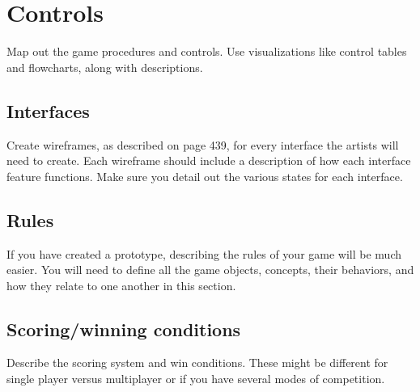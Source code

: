 \section{Controls} %
Map out the game procedures and controls. Use visualizations like control tables
and flowcharts, along with descriptions.

\subsection{Interfaces} %
Create wireframes, as described on page 439, for every interface the artists
will need to create. Each wireframe should include a description of how each
interface feature functions. Make sure you detail out the various states for
each interface.

\subsection{Rules} %
If you have created a prototype, describing the rules of your game will be much
easier. You will need to define all the game objects, concepts, their behaviors,
and how they relate to one another in this section.

\subsection{Scoring/winning conditions}%
Describe the scoring system and win conditions. These might be different for
single player versus multiplayer or if you have several modes of competition.